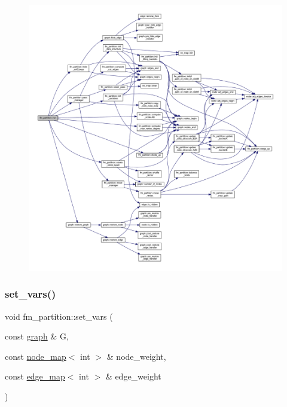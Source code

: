 \begin{figure}[H]
\begin{center}
\leavevmode
\includegraphics[width=350pt]{classfm__partition_a015b171fcaa01973ebe6c6a46a727097_cgraph}
\end{center}
\end{figure}
\mbox{\label{classfm__partition_aa15471da2b6a0f14060b0c4091c6b05c}} 
\subsubsection{\texorpdfstring{set\+\_\+vars()}{set\_vars()}\hspace{0.1cm}{\footnotesize\ttfamily [1/4]}}
{\footnotesize\ttfamily void fm\+\_\+partition\+::set\+\_\+vars (\begin{DoxyParamCaption}\item[{const \mbox{\hyperlink{classgraph}{graph}} \&}]{G,  }\item[{const \mbox{\hyperlink{classnode__map}{node\+\_\+map}}$<$ int $>$ \&}]{node\+\_\+weight,  }\item[{const \mbox{\hyperlink{classedge__map}{edge\+\_\+map}}$<$ int $>$ \&}]{edge\+\_\+weight }\end{DoxyParamCaption})}

